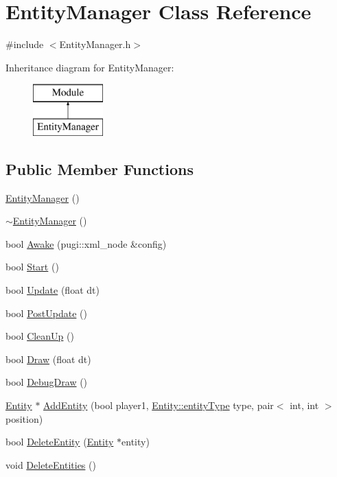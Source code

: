 \hypertarget{class_entity_manager}{}\section{Entity\+Manager Class Reference}
\label{class_entity_manager}


{\ttfamily \#include $<$Entity\+Manager.\+h$>$}

Inheritance diagram for Entity\+Manager\+:\begin{figure}[H]
\begin{center}
\leavevmode
\includegraphics[height=2.000000cm]{class_entity_manager}
\end{center}
\end{figure}
\subsection*{Public Member Functions}
\begin{DoxyCompactItemize}
\item 
\mbox{\hyperlink{class_entity_manager_a7555637657d090171be6ceee8451de0a}{Entity\+Manager}} ()
\item 
\mbox{\hyperlink{class_entity_manager_a71a36c9fb8d579a1a1ec108e0fccf175}{$\sim$\+Entity\+Manager}} ()
\item 
bool \mbox{\hyperlink{class_entity_manager_ada35a7fdb9b3bbaaee41a9451c94c1f9}{Awake}} (pugi\+::xml\+\_\+node \&config)
\item 
bool \mbox{\hyperlink{class_entity_manager_ac2cdeaf31edc0c79e0a05f4da05d5351}{Start}} ()
\item 
bool \mbox{\hyperlink{class_entity_manager_ab86bf1458923878536cf87792ded0a9b}{Update}} (float dt)
\item 
bool \mbox{\hyperlink{class_entity_manager_a1ad9ecfb4c966a1b399146d5a9209425}{Post\+Update}} ()
\item 
bool \mbox{\hyperlink{class_entity_manager_abe98672d529a2abf89bba1204338b6c0}{Clean\+Up}} ()
\item 
bool \mbox{\hyperlink{class_entity_manager_a14dcddc0ebfa5b4c4536e4d019d7ae07}{Draw}} (float dt)
\item 
bool \mbox{\hyperlink{class_entity_manager_a779c63016dbe34a2587838dba7011601}{Debug\+Draw}} ()
\item 
\mbox{\hyperlink{class_entity}{Entity}} $\ast$ \mbox{\hyperlink{class_entity_manager_a9199d9019f4825766b376db5edc77b94}{Add\+Entity}} (bool player1, \mbox{\hyperlink{class_entity_afd4a8ca3ac152f193c21d6a5100f1192}{Entity\+::entity\+Type}} type, pair$<$ int, int $>$ position)
\item 
bool \mbox{\hyperlink{class_entity_manager_a87f90f44445959b021c31d62506f1aa4}{Delete\+Entity}} (\mbox{\hyperlink{class_entity}{Entity}} $\ast$entity)
\item 
void \mbox{\hyperlink{class_entity_manager_af67721fd911b6284b3f8581a75dc8d64}{Delete\+Entities}} ()
\end{DoxyCompactItemize}
